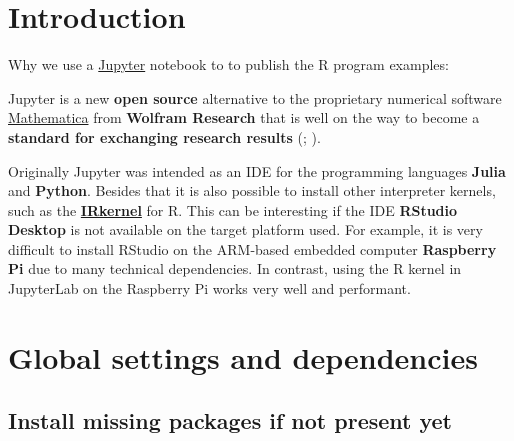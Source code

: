 \documentclass [oneside,10pt,a4paper,ngerman,BCOR10mm,headsepline,parindent,final]{scrartcl}
\begin{document}
    \newpage

    \pagestyle{fancy}
    \fancyhf{}
    \fancyhead[ER,OR]{\leftmark}

    \renewcommand{\sectionmark}[1]{
        \markboth{\thesection{} #1}{}
    }

    
    \tableofcontents
    
    


    
    \hypertarget{introduction}{%
\section{Introduction}\label{introduction}}

Why we use a
\href{https://en.wikipedia.org/wiki/Project_Jupyter}{Jupyter} notebook
to to publish the R program examples:

Jupyter is a new \textbf{open source} alternative to the proprietary
numerical software
\href{https://en.wikipedia.org/wiki/Wolfram_Mathematica}{Mathematica}
from \textbf{Wolfram Research} that is well on the way to become a
\textbf{standard for exchanging research results}
(\cite{Scientific_Paper_obsolete_2018};
\cite{Future_of_Research_Paper_2018}).

Originally Jupyter was intended as an IDE for the programming languages
\textbf{Julia} and \textbf{Python}. Besides that it is also possible to
install other interpreter kernels, such as the
\textbf{\href{https://irkernel.github.io/installation/}{IRkernel}} for
R. This can be interesting if the IDE \textbf{RStudio Desktop} is not
available on the target platform used. For example, it is very difficult
to install RStudio on the ARM-based embedded computer \textbf{Raspberry
Pi} due to many technical dependencies. In contrast, using the R kernel
in JupyterLab on the Raspberry Pi works very well and performant.

    \hypertarget{global-settings-and-dependencies}{%
\section{Global settings and
dependencies}\label{global-settings-and-dependencies}}

\hypertarget{install-missing-packages-if-not-present-yet}{%
\subsection{Install missing packages if not present
yet}\label{install-missing-packages-if-not-present-yet}}
\end{document}
